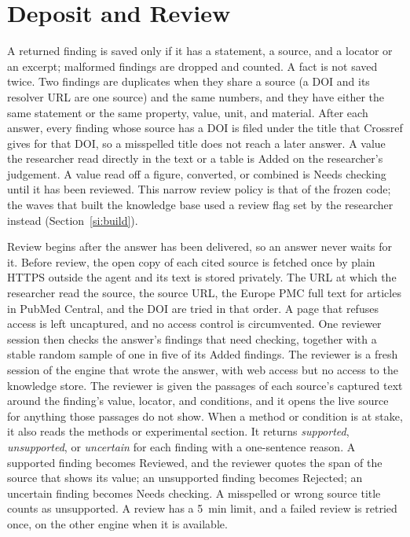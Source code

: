 \documentclass[journal=mamobx,manuscript=suppinfo]{achemso}
\begin{document}
\section{Deposit and Review}
\label{si:review}

A returned finding is saved only if it has a statement, a source, and a locator or an excerpt; malformed findings are dropped and counted.
A fact is not saved twice.
Two findings are duplicates when they share a source (a DOI and its resolver URL are one source) and the same numbers, and they have either the same statement or the same property, value, unit, and material.
After each answer, every finding whose source has a DOI is filed under the title that Crossref gives for that DOI, so a misspelled title does not reach a later answer.
A value the researcher read directly in the text or a table is Added on the researcher's judgement.
A value read off a figure, converted, or combined is Needs checking until it has been reviewed.
This narrow review policy is that of the frozen code; the waves that built the knowledge base used a review flag set by the researcher instead (Section~\ref{si:build}).

Review begins after the answer has been delivered, so an answer never waits for it.
Before review, the open copy of each cited source is fetched once by plain HTTPS outside the agent and its text is stored privately.
The URL at which the researcher read the source, the source URL, the Europe PMC full text for articles in PubMed Central, and the DOI are tried in that order.
A page that refuses access is left uncaptured, and no access control is circumvented.
One reviewer session then checks the answer's findings that need checking, together with a stable random sample of one in five of its Added findings.
The reviewer is a fresh session of the engine that wrote the answer, with web access but no access to the knowledge store.
The reviewer is given the passages of each source's captured text around the finding's value, locator, and conditions, and it opens the live source for anything those passages do not show.
When a method or condition is at stake, it also reads the methods or experimental section.
It returns \emph{supported}, \emph{unsupported}, or \emph{uncertain} for each finding with a one-sentence reason.
A supported finding becomes Reviewed, and the reviewer quotes the span of the source that shows its value; an unsupported finding becomes Rejected; an uncertain finding becomes Needs checking.
A misspelled or wrong source title counts as unsupported.
A review has a 5~min limit, and a failed review is retried once, on the other engine when it is available.
\end{document}
